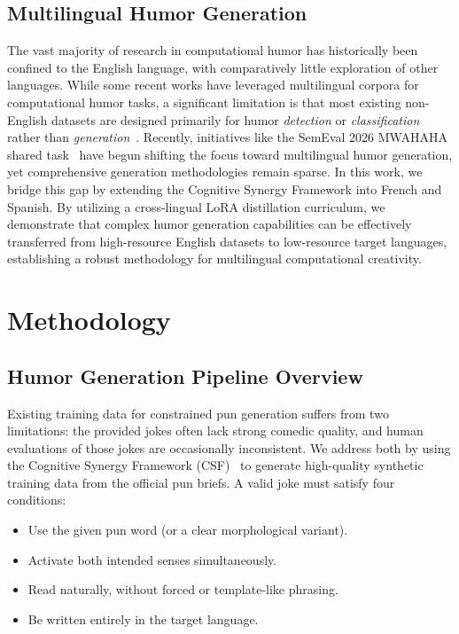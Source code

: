 \documentclass[]{ceurart}
\begin{document}
\subsection{Multilingual Humor Generation}
The vast majority of research in computational humor has historically been confined to the English language, with comparatively little exploration of other languages. While some recent works have leveraged multilingual corpora for computational humor tasks\cite{ermakova2025overview, ermakova2023joker}, a significant limitation is that most existing non-English datasets are designed primarily for humor \emph{detection} or \emph{classification} rather than \emph{generation}~\cite{he2024chumor, he2025chumor, ortega2018uo, yatsu2018comparison, ajayiautomatic}. Recently, initiatives like the SemEval 2026 MWAHAHA shared task~\cite{semeval2026mwahaha} have begun shifting the focus toward multilingual humor generation, yet comprehensive generation methodologies remain sparse. In this work, we bridge this gap by extending the Cognitive Synergy Framework\cite{ajayi2026humorgen} into French and Spanish. By utilizing a cross-lingual LoRA distillation curriculum, we demonstrate that complex humor generation capabilities can be effectively transferred from high-resource English datasets to low-resource target languages, establishing a robust methodology for multilingual computational creativity.

\section{Methodology}
\label{sec:methodology}

\subsection{Humor Generation Pipeline Overview}
\label{sec:design}

Existing training data for constrained pun generation suffers from two limitations:
the provided jokes often lack strong comedic quality, and human evaluations of
those jokes are occasionally inconsistent.
We address both by using the Cognitive Synergy Framework
(CSF)~\cite{ajayi2026humorgen} to generate high-quality synthetic training data
from the official pun briefs.
A valid joke must satisfy four conditions:
\begin{itemize}
    \item Use the given pun word (or a clear morphological variant).
    \item Activate both intended senses simultaneously.
    \item Read naturally, without forced or template-like phrasing.
    \item Be written entirely in the target language.
\end{itemize}
\end{document}
